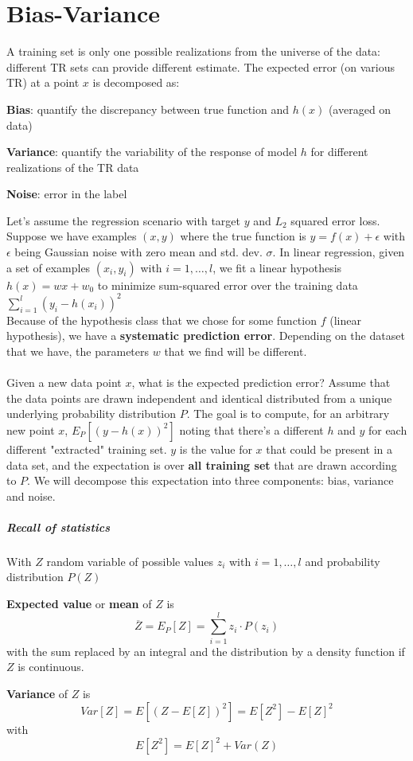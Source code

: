 \documentclass[10pt]{report}
\begin{document}
\section{Bias-Variance} A training set is only one possible realizations from the universe of the data: different TR sets can provide different estimate. The expected error (on various TR) at a point $x$ is decomposed as:
\begin{list}{}{}
	\item \textbf{Bias}: quantify the discrepancy between true function and $h(x)$ (averaged on data)
	\item \textbf{Variance}: quantify the variability of the response of model $h$ for different realizations of the TR data
	\item \textbf{Noise}: error in the label
\end{list}
Let's assume the regression scenario with target $y$ and $L_2$ squared error loss. Suppose we have examples $(x,y)$ where the true function is $y = f(x) + \epsilon$ with $\epsilon$ being Gaussian noise with zero mean and std. dev. $\sigma$. In linear regression, given a set of examples $(x_i,y_i)$ with $i = 1,\ldots,l$, we fit a linear hypothesis $h(x) = wx + w_0$ to minimize sum-squared error over the training data $\sum_{i=1}^l (y_i - h(x_i))^2$\\
Because of the hypothesis class that we chose for some function $f$ (linear hypothesis), we have a \textbf{systematic prediction error}. Depending on the dataset that we have, the parameters $w$ that we find will be different.\\\\
Given a new data point $x$, what is the expected prediction error? Assume that the data points are drawn independent and identical distributed from a unique underlying probability distribution $P$. The goal is to compute, for an arbitrary new point $x$, $E_P[(y - h(x))^2]$ noting that there's a different $h$ and $y$ for each different "extracted" training set. $y$ is the value for $x$ that could be present in a data set, and the expectation is over \textbf{all training set} that are drawn according to $P$. We will decompose this expectation into three components: bias, variance and noise.
\subparagraph{Recall of statistics} With $Z$ random variable of possible values $z_i$ with $i=1,\ldots,l$ and probability distribution $P(Z)$
\begin{list}{}{}
	\item \textbf{Expected value} or \textbf{mean} of $Z$ is $$\overline{Z} = E_P[Z] = \sum_{i=1}^l z_i\cdot P(z_i)$$ with the sum replaced by an integral and the distribution by a density function if $Z$ is continuous.
	\item \textbf{Variance} of $Z$ is $$Var[Z] = E[(Z - E[Z])^2] = E[Z^2] - E[Z]^2$$ with $$E[Z^2] = E[Z]^2 + Var(Z)$$
\end{list}
\end{document}
